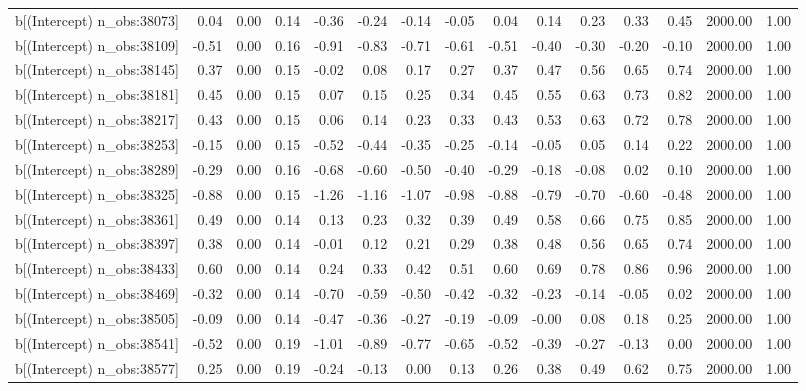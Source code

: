 \begin{table}[ht]
\begin{tabular}{rrrrrrrrrrrrrrr}
  b[(Intercept) n\_obs:38073] & 0.04 & 0.00 & 0.14 & -0.36 & -0.24 & -0.14 & -0.05 & 0.04 & 0.14 & 0.23 & 0.33 & 0.45 & 2000.00 & 1.00 \\ 
  b[(Intercept) n\_obs:38109] & -0.51 & 0.00 & 0.16 & -0.91 & -0.83 & -0.71 & -0.61 & -0.51 & -0.40 & -0.30 & -0.20 & -0.10 & 2000.00 & 1.00 \\ 
  b[(Intercept) n\_obs:38145] & 0.37 & 0.00 & 0.15 & -0.02 & 0.08 & 0.17 & 0.27 & 0.37 & 0.47 & 0.56 & 0.65 & 0.74 & 2000.00 & 1.00 \\ 
  b[(Intercept) n\_obs:38181] & 0.45 & 0.00 & 0.15 & 0.07 & 0.15 & 0.25 & 0.34 & 0.45 & 0.55 & 0.63 & 0.73 & 0.82 & 2000.00 & 1.00 \\ 
  b[(Intercept) n\_obs:38217] & 0.43 & 0.00 & 0.15 & 0.06 & 0.14 & 0.23 & 0.33 & 0.43 & 0.53 & 0.63 & 0.72 & 0.78 & 2000.00 & 1.00 \\ 
  b[(Intercept) n\_obs:38253] & -0.15 & 0.00 & 0.15 & -0.52 & -0.44 & -0.35 & -0.25 & -0.14 & -0.05 & 0.05 & 0.14 & 0.22 & 2000.00 & 1.00 \\ 
  b[(Intercept) n\_obs:38289] & -0.29 & 0.00 & 0.16 & -0.68 & -0.60 & -0.50 & -0.40 & -0.29 & -0.18 & -0.08 & 0.02 & 0.10 & 2000.00 & 1.00 \\ 
  b[(Intercept) n\_obs:38325] & -0.88 & 0.00 & 0.15 & -1.26 & -1.16 & -1.07 & -0.98 & -0.88 & -0.79 & -0.70 & -0.60 & -0.48 & 2000.00 & 1.00 \\ 
  b[(Intercept) n\_obs:38361] & 0.49 & 0.00 & 0.14 & 0.13 & 0.23 & 0.32 & 0.39 & 0.49 & 0.58 & 0.66 & 0.75 & 0.85 & 2000.00 & 1.00 \\ 
  b[(Intercept) n\_obs:38397] & 0.38 & 0.00 & 0.14 & -0.01 & 0.12 & 0.21 & 0.29 & 0.38 & 0.48 & 0.56 & 0.65 & 0.74 & 2000.00 & 1.00 \\ 
  b[(Intercept) n\_obs:38433] & 0.60 & 0.00 & 0.14 & 0.24 & 0.33 & 0.42 & 0.51 & 0.60 & 0.69 & 0.78 & 0.86 & 0.96 & 2000.00 & 1.00 \\ 
  b[(Intercept) n\_obs:38469] & -0.32 & 0.00 & 0.14 & -0.70 & -0.59 & -0.50 & -0.42 & -0.32 & -0.23 & -0.14 & -0.05 & 0.02 & 2000.00 & 1.00 \\ 
  b[(Intercept) n\_obs:38505] & -0.09 & 0.00 & 0.14 & -0.47 & -0.36 & -0.27 & -0.19 & -0.09 & -0.00 & 0.08 & 0.18 & 0.25 & 2000.00 & 1.00 \\ 
  b[(Intercept) n\_obs:38541] & -0.52 & 0.00 & 0.19 & -1.01 & -0.89 & -0.77 & -0.65 & -0.52 & -0.39 & -0.27 & -0.13 & 0.00 & 2000.00 & 1.00 \\ 
  b[(Intercept) n\_obs:38577] & 0.25 & 0.00 & 0.19 & -0.24 & -0.13 & 0.00 & 0.13 & 0.26 & 0.38 & 0.49 & 0.62 & 0.75 & 2000.00 & 1.00 \\ 

\end{tabular}
\end{table}
